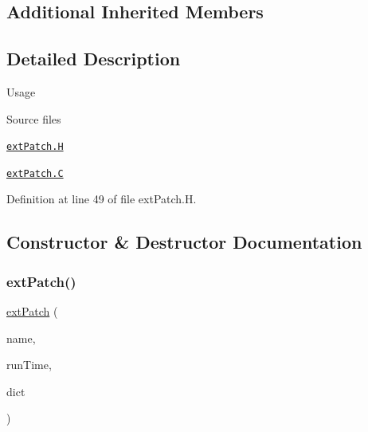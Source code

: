\subsection*{Additional Inherited Members}


\subsection{Detailed Description}
\label{_Description}%
 \begin{DoxyParagraph}{Usage}

\end{DoxyParagraph}
\begin{DoxyParagraph}{Source files}

\begin{DoxyItemize}
\item \href{../../../home/carlo/data/GeN-Foam/GeN-Foam_ffn/GeN-Foam/GeN-Foam/FMU4FOAM/ECI4FOAM/src/externalComm/externalIO/output/extPatch/extPatch.H}{\tt ext\+Patch.\+H} 
\item \href{../../../home/carlo/data/GeN-Foam/GeN-Foam_ffn/GeN-Foam/GeN-Foam/FMU4FOAM/ECI4FOAM/src/externalComm/externalIO/output/extPatch/extPatch.C}{\tt ext\+Patch.\+C} 
\end{DoxyItemize}
\end{DoxyParagraph}


Definition at line 49 of file ext\+Patch.\+H.



\subsection{Constructor \& Destructor Documentation}
\mbox{\label{classFoam_1_1externalIOObject_1_1extPatch_a2674cb20c62334a83f8f5a104dff0294}} 
\subsubsection{\texorpdfstring{ext\+Patch()}{extPatch()}\hspace{0.1cm}{\footnotesize\ttfamily [1/2]}}
{\footnotesize\ttfamily \hyperlink{classFoam_1_1externalIOObject_1_1extPatch}{ext\+Patch} (\begin{DoxyParamCaption}\item[{const word \&}]{name,  }\item[{const Time \&}]{run\+Time,  }\item[{const dictionary \&}]{dict }\end{DoxyParamCaption})}



